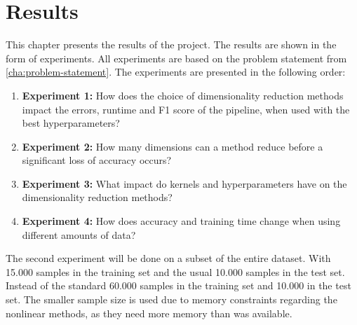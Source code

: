 \chapter{Results}\label{cha:results}
This chapter presents the results of the project. The results are shown in the form of experiments. All experiments are based on the problem statement from \autoref{cha:problem-statement}. The experiments are presented in the following order:


\begin{enumerate}
    \item \textbf{Experiment 1:} How does the choice of dimensionality reduction methods impact the errors, runtime and F1 score of the pipeline, when used with the best hyperparameters?
    \item \textbf{Experiment 2:} How many dimensions can a method reduce before a significant loss of accuracy occurs?
    \item \textbf{Experiment 3:} What impact do kernels and hyperparameters have on the dimensionality reduction methods?
    \item \textbf{Experiment 4:} How does accuracy and training time change when using different amounts of data?
\end{enumerate}



The second experiment will be done on a subset of the entire dataset. With 15.000 samples in the training set and the usual 10.000 samples in the test set. Instead of the standard 60.000 samples in the training set and 10.000 in the test set. The smaller sample size is used due to memory constraints regarding the nonlinear methods, as they need more memory than was available.





